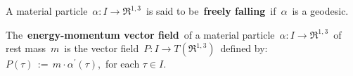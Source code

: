 \begin{definition}
\mbox{}
\vskip -0.01cm
\noindent
A material particle
\,$\alpha : I \longrightarrow \Re^{1,3}$\,
is said to be \,\textbf{freely falling}\,
if \,$\alpha$\, is a geodesic.
\end{definition}


\vskip 0.4cm
\begin{definition}
\mbox{}
\vskip -0.01cm
\noindent
The \,\textbf{energy-momentum vector field}\,
of a material particle 
\,$\alpha : I \longrightarrow \Re^{1,3}$\,
of rest mass \,$m$\, is the vector field
\,$P : I \longrightarrow T(\Re^{1,3})$\,
defined by:
\,$P(\tau) \,:=\, m\cdot\alpha^{\prime}(\tau)$,\,
for each $\tau \in I$.
\end{definition}


